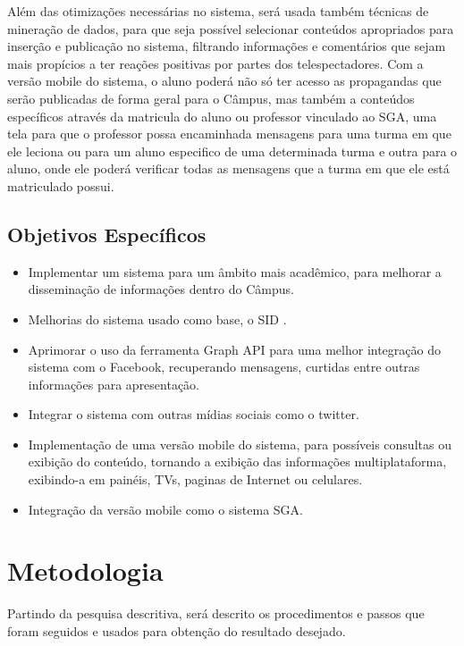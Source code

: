 Além das otimizações necessárias no sistema, será usada também técnicas de mineração
de dados, para que seja possível selecionar conteúdos apropriados para inserção
e publicação no sistema, filtrando informações e comentários que sejam mais propícios a
ter reações positivas por partes dos telespectadores. Com a versão mobile do sistema, o
aluno poderá não só ter acesso as propagandas que serão publicadas de forma geral para o
Câmpus, mas também a conteúdos específicos através da matricula do aluno ou professor
vinculado ao SGA, uma tela para que o professor possa encaminhada mensagens para
uma turma em que ele leciona ou para um aluno especifico de uma determinada turma e
outra para o aluno, onde ele poderá verificar todas as mensagens que a turma em que ele
está matriculado possui.



\subsection{Objetivos Específicos}
	 \begin{itemize}
	\item Implementar um sistema para um âmbito mais acadêmico, para melhorar a disseminação de informações dentro do Câmpus.
	 	
	\item Melhorias do sistema usado como base, o SID \cite{sobrinho2017}.
	
	\item Aprimorar o uso da ferramenta Graph API para uma melhor integração do sistema com o Facebook, recuperando mensagens, curtidas entre outras informações para apresentação.
	
	\item Integrar o sistema com outras mídias sociais como o twitter.
	
	\item Implementação de uma versão mobile do sistema, para possíveis consultas ou exibição do conteúdo, tornando a exibição das informações multiplataforma, exibindo-a em painéis, TVs, paginas de Internet ou celulares.
	
	\item  Integração da versão mobile como o sistema SGA.
	\end{itemize}
\section{Metodologia}
Partindo da pesquisa descritiva, será descrito os procedimentos e passos que foram seguidos e usados para obtenção do resultado desejado.
	
